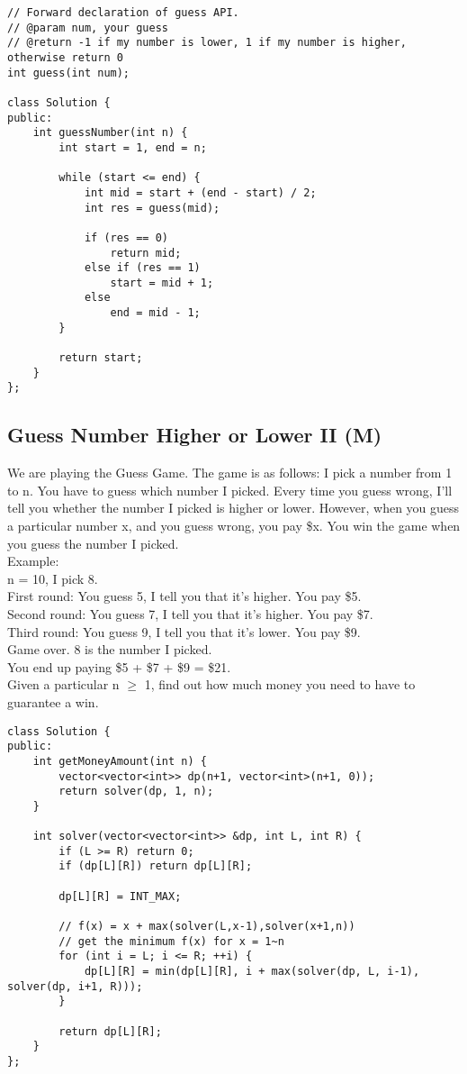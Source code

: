 \begin{lstlisting}
// Forward declaration of guess API.
// @param num, your guess
// @return -1 if my number is lower, 1 if my number is higher, otherwise return 0
int guess(int num);

class Solution {
public:
    int guessNumber(int n) {
        int start = 1, end = n;
        
        while (start <= end) {
            int mid = start + (end - start) / 2;
            int res = guess(mid);
            
            if (res == 0)   
                return mid;
            else if (res == 1)  
                start = mid + 1;
            else
                end = mid - 1;
        }
        
        return start;
    }
};
\end{lstlisting}


\subsection{Guess Number Higher or Lower II (M)}
We are playing the Guess Game. The game is as follows: I pick a number from 1 to n. You have to guess which number I picked. Every time you guess wrong, I'll tell you whether the number I picked is higher or lower. However, when you guess a particular number x, and you guess wrong, you pay \$x. You win the game when you guess the number I picked. \\

Example:\\
n = 10, I pick 8.\\
First round:  You guess 5, I tell you that it's higher. You pay \$5. \\
Second round: You guess 7, I tell you that it's higher. You pay \$7.\\
Third round:  You guess 9, I tell you that it's lower. You pay \$9.\\
Game over. 8 is the number I picked.\\
You end up paying \$5 + \$7 + \$9 = \$21.\\

Given a particular n $\geq$ 1, find out how much money you need to have to guarantee a win.\\

\begin{lstlisting}
class Solution {
public:
    int getMoneyAmount(int n) {
        vector<vector<int>> dp(n+1, vector<int>(n+1, 0));
        return solver(dp, 1, n);
    }
    
    int solver(vector<vector<int>> &dp, int L, int R) {
        if (L >= R) return 0;
        if (dp[L][R]) return dp[L][R];
        
        dp[L][R] = INT_MAX;
        
        // f(x) = x + max(solver(L,x-1),solver(x+1,n))
        // get the minimum f(x) for x = 1~n
        for (int i = L; i <= R; ++i) {
            dp[L][R] = min(dp[L][R], i + max(solver(dp, L, i-1), solver(dp, i+1, R)));
        }
        
        return dp[L][R];
    }
};
\end{lstlisting}


